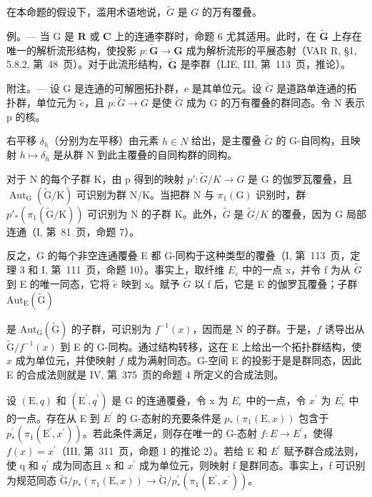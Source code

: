 在本命题的假设下，滥用术语地说，\(\tilde{G}\) 是 \(G\) 的万有覆叠。

例。--- 当 G 是 \(\mathbf{R}\) 或 \(\mathbf{C}\) 上的连通李群时，命题 6 尤其适用。此时，在 \(\widetilde{\mathbf{G}}\) 上存在唯一的解析流形结构，使投影 \(p\colon\widetilde{\mathbf{G}}\to\mathbf{G}\) 成为解析流形的平展态射（VAR R, §1, 5.8.2, 第~48~页）。对于此流形结构，\(\widetilde{\mathbf{G}}\) 是李群（LIE, III, 第~113~页，推论）。

附注。--- 设 G 是连通的可解圈拓扑群，e 是其单位元。设 \(\widetilde{G}\) 是道路单连通的拓扑群，单位元为 \(\widetilde{e}\)，且 \(p\colon\widetilde{G}\to G\) 是使 \(\widetilde{G}\) 成为 G 的万有覆叠的群同态。令 N 表示 p 的核。

右平移 \(\delta_{h}\)（分别为左平移）由元素 \(h \in N\) 给出，是主覆叠 \(\widetilde{G}\) 的 G-自同构，且映射 \(h \mapsto \delta_{h}\) 是从群 N 到此主覆叠的自同构群的同构。

对于 N 的每个子群 K，由 p 得到的映射 \(p'\colon\widetilde{G}/K\to G\) 是 G 的伽罗瓦覆叠，且 \(\operatorname{Aut}_{\mathrm{G}}(\widetilde{\mathrm{G}}/\mathrm{K})\) 可识别为群 N/K。当把群 N 与 \(\pi_{1}(\mathrm{G})\) 识别时，群 \(p'_{*}(\pi_{1}(\widetilde{\mathrm{G}}/\mathrm{K}))\) 可识别为 N 的子群 K。此外，\(\widetilde{G}\) 是 \(\widetilde{G}/K\) 的覆叠，因为 G 局部连通（I, 第~81~页，命题 7）。

反之，G 的每个非空连通覆叠 E 都 G-同构于这种类型的覆叠（I, 第~113~页，定理 3 和 I, 第~111~页，命题 10）。事实上，取纤维 \(E_{e}\) 中的一点 x，并令 f 为从 \(\widetilde{G}\) 到 E 的唯一同态，它将 \(\widetilde{e}\) 映到 x。赋予 \(\widetilde{G}\) 以 f 后，它是 E 的伽罗瓦覆叠；子群 \(\mathrm{Aut}_{\mathrm{E}}(\widetilde{\mathrm{G}})\)

是 \(\mathrm{Aut}_{\mathrm{G}}(\widetilde{\mathrm{G}})\) 的子群，可识别为 \(f^{-1}(x)\)，因而是 N 的子群。于是，\(f\) 诱导出从 \(\widetilde{\mathrm{G}} / f^{-1}(x)\) 到 E 的 G-同构。通过结构转移，这在 E 上给出一个拓扑群结构，使 \(x\) 成为单位元，并使映射 \(f\) 成为满射同态。G-空间 E 的投影于是是群同态，因此 E 的合成法则就是 IV, 第~375~页的命题 4 所定义的合成法则。

设 \((\mathrm{E},q)\) 和 \((\mathrm{E}^{\prime},q^{\prime})\) 是 G 的连通覆叠，令 x 为 \(E_{e}\) 中的一点，令 \(x^{\prime}\) 为 \(E_{e}^{\prime}\) 中的一点。存在从 E 到 \(E^{\prime}\) 的 G-态射的充要条件是 \(p_{*}(\pi_{1}(\mathrm{E},x))\) 包含于 \(p_{*}^{\prime}(\pi_{1}(\mathrm{E}^{\prime},x^{\prime}))\)。若此条件满足，则存在唯一的 G-态射 \(f\colon E\to E^{\prime}\)，使得 \(f(x)=x^{\prime}\)（III, 第~311~页，命题 1 的推论 2）。若给 E 和 \(E^{\prime}\) 赋予群合成法则，使 q 和 \(q^{\prime}\) 成为同态且 x 和 \(x^{\prime}\) 成为单位元，则映射 f 是群同态。事实上，f 可识别为规范同态 \(\widetilde{\mathrm{G}}/p_{*}(\pi_{1}(\mathrm{E},x))\to\widetilde{\mathrm{G}}/p_{*}^{\prime}(\pi_{1}(\mathrm{E}^{\prime},x^{\prime}))\)。

